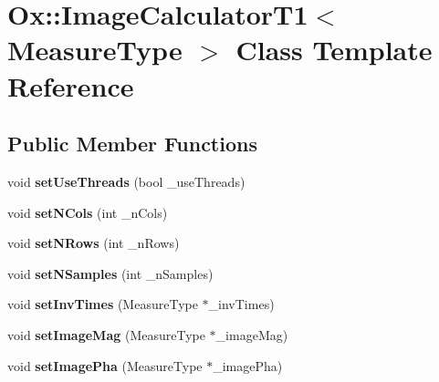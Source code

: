 \hypertarget{class_ox_1_1_image_calculator_t1}{\section{Ox\-:\-:Image\-Calculator\-T1$<$ Measure\-Type $>$ Class Template Reference}
\label{class_ox_1_1_image_calculator_t1}
}
\subsection*{Public Member Functions}
\begin{DoxyCompactItemize}
\item 
\hypertarget{class_ox_1_1_image_calculator_t1_af554bf4191ef1d52469e5bb2fa832a57}{void {\bfseries set\-Use\-Threads} (bool \-\_\-use\-Threads)}\label{class_ox_1_1_image_calculator_t1_af554bf4191ef1d52469e5bb2fa832a57}

\item 
\hypertarget{class_ox_1_1_image_calculator_t1_aea2ffd0ea8668a198c8142a21c1eef4f}{void {\bfseries set\-N\-Cols} (int \-\_\-n\-Cols)}\label{class_ox_1_1_image_calculator_t1_aea2ffd0ea8668a198c8142a21c1eef4f}

\item 
\hypertarget{class_ox_1_1_image_calculator_t1_ab4cbe03b2105cc5e5d61432d3c320ab3}{void {\bfseries set\-N\-Rows} (int \-\_\-n\-Rows)}\label{class_ox_1_1_image_calculator_t1_ab4cbe03b2105cc5e5d61432d3c320ab3}

\item 
\hypertarget{class_ox_1_1_image_calculator_t1_a35729c3ccb7f4e3426a16682cecdb8a1}{void {\bfseries set\-N\-Samples} (int \-\_\-n\-Samples)}\label{class_ox_1_1_image_calculator_t1_a35729c3ccb7f4e3426a16682cecdb8a1}

\item 
\hypertarget{class_ox_1_1_image_calculator_t1_a92cbd8b336a8aaac7c7b9e5b52968454}{void {\bfseries set\-Inv\-Times} (Measure\-Type $\ast$\-\_\-inv\-Times)}\label{class_ox_1_1_image_calculator_t1_a92cbd8b336a8aaac7c7b9e5b52968454}

\item 
\hypertarget{class_ox_1_1_image_calculator_t1_a5193dd7849ec11b2173cb94fb0bcd74b}{void {\bfseries set\-Image\-Mag} (Measure\-Type $\ast$\-\_\-image\-Mag)}\label{class_ox_1_1_image_calculator_t1_a5193dd7849ec11b2173cb94fb0bcd74b}

\item 
\hypertarget{class_ox_1_1_image_calculator_t1_a4506dab7d6ad85807b68ad4b1ab7fb85}{void {\bfseries set\-Image\-Pha} (Measure\-Type $\ast$\-\_\-image\-Pha)}\label{class_ox_1_1_image_calculator_t1_a4506dab7d6ad85807b68ad4b1ab7fb85}


\end{DoxyCompactItemize}

